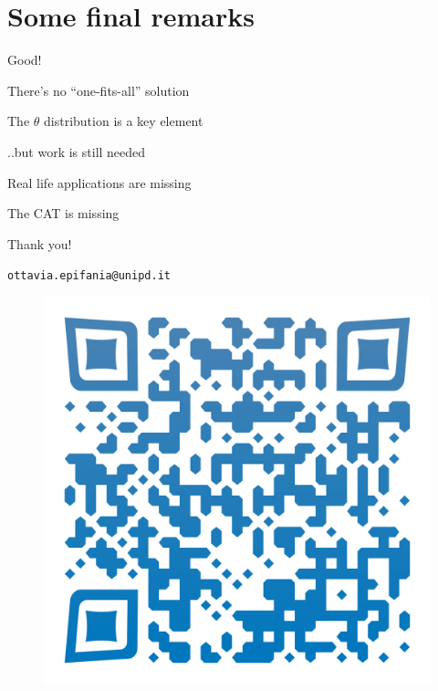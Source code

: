 \documentclass{beamer} %
\begin{document}
\section[Final remarks]{Some final remarks}

\begin{frame}


\begin{exampleblock}{Good!}
	
	There's no ``one-fits-all'' solution
	
		\vspace{2mm}
		
		 The $\theta$ distribution is a key element
\end{exampleblock}

\pause
\begin{alertblock}{..but work is still needed}
		
				\vspace{2mm}
		Real life applications are missing
		
				\vspace{2mm}
		The CAT is missing
\end{alertblock}

\end{frame}

\begin{frame}[plain]
	\vspace{2cm}
	\begin{center}
		\large{Thank you!}
		
		\vspace{3mm}
		\texttt{ottavia.epifania@unipd.it}
		
	\begin{figure}
		\centering
		\includegraphics[width=0.4\linewidth]{img/codeSlide}
	\end{figure}
	
	
	\end{center}
\end{frame}
\end{document}
